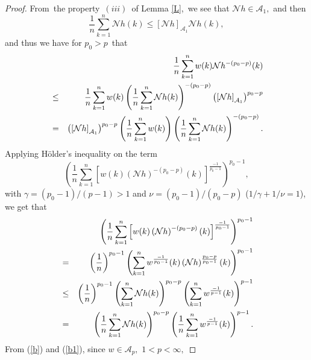 \documentclass[a4paper]{amsart}
\theoremstyle{plain}
\numberwithin{equation}{section}
\begin{document}
\begin{proof}
From\ the property\ $(iii)$\ of Lemma \ref{L},\ we see that $\mathcal{N}h\in 
\mathcal{A}_{1},$ and then 
\begin{equation*}
\frac{1}{n}\sum\limits_{k=1}^{n}\mathcal{N}h(k)\leq \left[ \mathcal{N}h%
\right] _{\mathcal{A}_{1}}\mathcal{N}h(k),
\end{equation*}%
and thus we have for $p_{0}>p$\ that%
\begin{eqnarray}
&&\frac{1}{n}\sum\limits_{k=1}^{n}w(k)\mathcal{N}h^{-\left( p_{0}-p\right)
}(k)  \notag \\
&\leq &\frac{1}{n}\sum\limits_{k=1}^{n}w(k)\left( \frac{1}{n}%
\sum\limits_{k=1}^{n}\mathcal{N}h(k)\right) ^{-\left( p_{0}-p\right) }\left( %
\left[ \mathcal{N}h\right] _{\mathcal{A}_{1}}\right) ^{p_{0}-p}  \notag \\
&=&\left( \left[ \mathcal{N}h\right] _{\mathcal{A}_{1}}\right)
^{p_{0}-p}\left( \frac{1}{n}\sum\limits_{k=1}^{n}w(k)\right) \left( \frac{1}{%
n}\sum\limits_{k=1}^{n}\mathcal{N}h(k)\right) ^{-\left( p_{0}-p\right) }.
\label{b}
\end{eqnarray}%
Applying H\"{o}lder's inequality on the term%
\begin{equation*}
\left( \frac{1}{n}\sum\limits_{k=1}^{n}\left[ w(k)\left( \mathcal{N}h\right)
^{-\left( p_{0}-p\right) }(k)\right] ^{\frac{-1}{p_{0}-1}}\right) ^{p_{0}-1},
\end{equation*}%
with $\gamma =\left( p_{0}-1\right) /\left( p-1\right) >1$ and $\nu =\left(
p_{0}-1\right) /\left( p_{0}-p\right) $ ($1/\gamma +1/\nu =1$), we get that 
\begin{eqnarray}
&&\left( \frac{1}{n}\sum\limits_{k=1}^{n}\left[ w(k)\left( \mathcal{N}%
h\right) ^{-\left( p_{0}-p\right) }(k)\right] ^{\frac{-1}{p_{0}-1}}\right)
^{p_{0}-1}  \notag \\
&=&\left( \frac{1}{n}\right) ^{p_{0}-1}\left( \sum\limits_{k=1}^{n}w^{\frac{%
-1}{p_{0}-1}}(k)\left( \mathcal{N}h\right) ^{\frac{p_{0}-p}{p_{0}-1}%
}(k)\right) ^{p_{0}-1}  \notag \\
&\leq &\left( \frac{1}{n}\right) ^{p_{0}-1}\left( \sum\limits_{k=1}^{n}%
\mathcal{N}h(k)\right) ^{p_{0}-p}\left( \sum\limits_{k=1}^{n}w^{\frac{-1}{p-1%
}}(k)\right) ^{p-1}  \notag \\
&=&\left( \frac{1}{n}\sum\limits_{k=1}^{n}\mathcal{N}h(k)\right)
^{p_{0}-p}\left( \frac{1}{n}\sum\limits_{k=1}^{n}w^{\frac{-1}{p-1}%
}(k)\right) ^{p-1}.  \label{b1}
\end{eqnarray}%
From (\ref{b}) and (\ref{b1}), since $w\in \mathcal{A}_{p},$ $1<p<\infty ,$

\end{proof}
\end{document}

